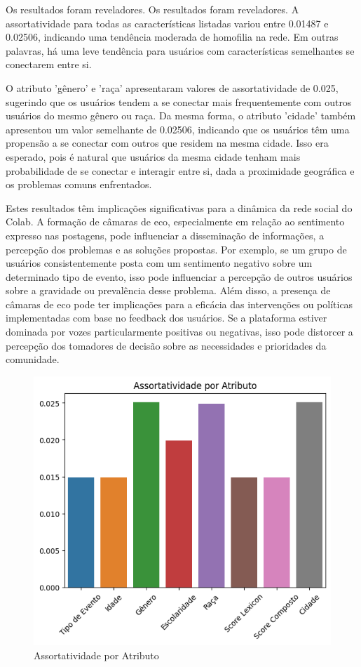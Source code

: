 Os resultados foram reveladores. Os resultados foram reveladores. A assortatividade para todas as características listadas variou entre 0.01487 e 0.02506, indicando uma tendência moderada de homofilia na rede. Em outras palavras, há uma leve tendência para usuários com características semelhantes se conectarem entre si.

O atributo 'gênero' e 'raça' apresentaram valores de assortatividade de 0.025, sugerindo que os usuários tendem a se conectar mais frequentemente com outros usuários do mesmo gênero ou raça. Da mesma forma, o atributo 'cidade' também apresentou um valor semelhante de 0.02506, indicando que os usuários têm uma propensão a se conectar com outros que residem na mesma cidade. Isso era esperado, pois é natural que usuários da mesma cidade tenham mais probabilidade de se conectar e interagir entre si, dada a proximidade geográfica e os problemas comuns enfrentados.

Estes resultados têm implicações significativas para a dinâmica da rede social do Colab. A formação de câmaras de eco, especialmente em relação ao sentimento expresso nas postagens, pode influenciar a disseminação de informações, a percepção dos problemas e as soluções propostas. Por exemplo, se um grupo de usuários consistentemente posta com um sentimento negativo sobre um determinado tipo de evento, isso pode influenciar a percepção de outros usuários sobre a gravidade ou prevalência desse problema. Além disso, a presença de câmaras de eco pode ter implicações para a eficácia das intervenções ou políticas implementadas com base no feedback dos usuários. Se a plataforma estiver dominada por vozes particularmente positivas ou negativas, isso pode distorcer a percepção dos tomadores de decisão sobre as necessidades e prioridades da comunidade.

\begin{figure}[!htb]
	\caption{Assortatividade por Atributo}
	\label{fig:assortativity_by_attribute}
	\centering
	\includegraphics[scale=0.75]{images/assortativity_by_attribute.png}
	\fautor
\end{figure}

